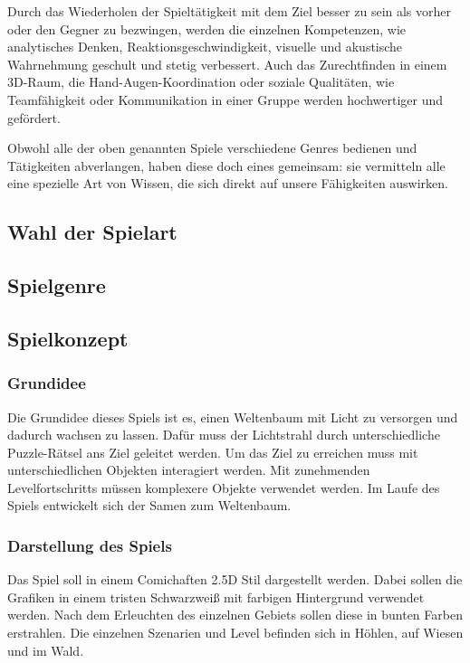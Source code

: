 Durch das Wiederholen der Spieltätigkeit mit dem Ziel besser zu sein als vorher oder den Gegner zu bezwingen, werden die einzelnen Kompetenzen, wie analytisches Denken, Reaktionsgeschwindigkeit, visuelle und akustische Wahrnehmung geschult und stetig verbessert. Auch das Zurechtfinden in einem 3D-Raum, die Hand-Augen-Koordination oder soziale Qualitäten, wie Teamfähigkeit oder Kommunikation in einer Gruppe werden hochwertiger und gefördert. 

Obwohl alle der oben genannten Spiele verschiedene Genres bedienen und Tätigkeiten abverlangen, haben diese doch eines gemeinsam: sie vermitteln alle eine spezielle Art von Wissen, die sich direkt auf unsere Fähigkeiten auswirken. 

\subsection{Wahl der Spielart}

\subsection{Spielgenre}

\subsection{Spielkonzept}
\subsubsection{Grundidee}
Die Grundidee dieses Spiels ist es, einen Weltenbaum mit Licht zu versorgen und dadurch wachsen zu lassen. Dafür muss der Lichtstrahl durch unterschiedliche Puzzle-Rätsel ans Ziel geleitet werden. Um das Ziel zu erreichen muss mit unterschiedlichen Objekten interagiert werden. Mit zunehmenden Levelfortschritts müssen komplexere Objekte verwendet werden. Im Laufe des Spiels entwickelt sich der Samen zum Weltenbaum.

\subsubsection{Darstellung des Spiels}
Das Spiel soll in einem Comichaften 2.5D Stil dargestellt werden. Dabei sollen die Grafiken in einem tristen Schwarzweiß mit farbigen Hintergrund verwendet werden. Nach dem Erleuchten des einzelnen Gebiets sollen diese in bunten Farben erstrahlen. Die einzelnen Szenarien und Level befinden sich in Höhlen, auf Wiesen und im Wald.

